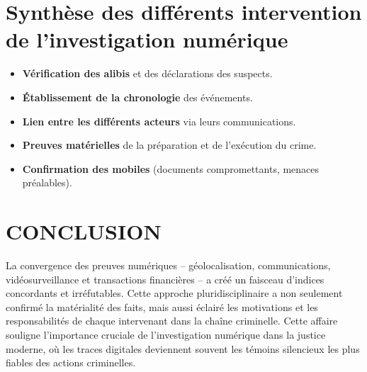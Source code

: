 \documentclass[12pt, a4em]{article}
\begin{document}
	\section*{Synthèse des différents intervention de l'investigation numérique}
	\begin{itemize}[leftmargin=*]
		\item \textbf{Vérification des alibis} et des déclarations des suspects.
		\item \textbf{Établissement de la chronologie} des événements.
		\item \textbf{Lien entre les différents acteurs} via leurs communications.
		\item \textbf{Preuves matérielles} de la préparation et de l'exécution du crime.
		\item \textbf{Confirmation des mobiles} (documents compromettants, menaces préalables).
	\end{itemize}

	\pagebreak
	\section*{CONCLUSION}
	
	La convergence des preuves numériques -- géolocalisation, communications, vidéosurveillance et transactions financières -- a créé un faisceau d'indices concordants et irréfutables. Cette approche pluridisciplinaire a non seulement confirmé la matérialité des faits, mais aussi éclairé les motivations et les responsabilités de chaque intervenant dans la chaîne criminelle. Cette affaire souligne l'importance cruciale de l'investigation numérique dans la justice moderne, où les traces digitales deviennent souvent les témoins silencieux les plus fiables des actions criminelles.
\end{document}
